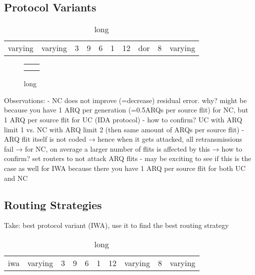 \subsection{Protocol Variants}
\begin{table}
    \centering
    \begin{tabulary}{\textwidth}{C|C|C|C|C|C|C|C|C|C}
        \pProtVar{} & \pNCMode{} & \pEncMods{} & \pAuthMods{} & \pRQSize{} & \pARQLimit{} & \pARQTimeout{} & \pRStrat{} & \pAttackerSet{} & \pAttackProb{} \\\hline
        varying & varying & 3 & 9 & 6 & 1 & 12 & \gls{dor} & 8 & varying \\
    \end{tabulary}
    \caption[Input parameters for protocol variant experiment]{long}
    \label{tab:setupprotvarexperiment}
\end{table}

\begin{figure}
    \centering
    \begin{tabular}{ll}
         &  \\
         & 
    \end{tabular}
    \caption[Results for protocol variant experiment]{long}
    \label{fig:resultsprotvarexperiment}
\end{figure}

Observations:
- NC does not improve (=decrease) residual error. why? might be because you have 1 ARQ per generation (=0.5ARQs per source flit) for NC, but 1 ARQ per
source flit for UC (IDA protocol)
  - how to confirm? UC with ARQ limit 1 vs. NC with ARQ limit 2 (then same amount of ARQs per source flit)
  - ARQ flit itself is not coded → hence when it gets attacked, all retransmissions fail → for NC, on average a larger number of flits is affected by
    this → how to confirm? set routers to not attack ARQ flits
  - may be exciting to see if this is the case as well for IWA because there you have 1 ARQ per source flit for both UC and NC

\subsection{Routing Strategies}
Take: best protocol variant (IWA), use it to find the best routing strategy

\begin{table}
    \centering
    \begin{tabulary}{\textwidth}{C|C|C|C|C|C|C|C|C|C}
        \pProtVar{} & \pNCMode{} & \pEncMods{} & \pAuthMods{} & \pRQSize{} & \pARQLimit{} & \pARQTimeout{} & \pRStrat{} & \pAttackerSet{} & \pAttackProb{} \\\hline
        \gls{iwa} & varying & 3 & 9 & 6 & 1 & 12 & varying & 8 & varying \\
    \end{tabulary}
    \caption[Input parameters for main experiment]{long}
    \label{tab:setuproutingstratexperiment}
\end{table}


